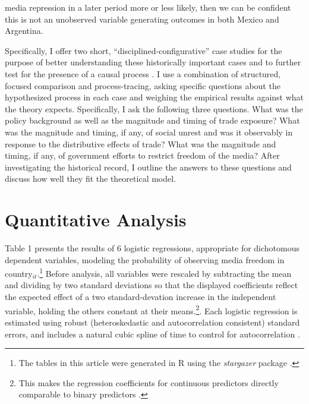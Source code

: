 \documentclass[12pt,a4paper]{article}
\begin{document}
media repression in a later period more or less likely, then we can be confident this is not an unobserved variable generating outcomes in both Mexico and Argentina.

Specifically, I offer two short, ``disciplined-configurative'' case studies for the purpose of better understanding these historically important cases and to further test for the presence of a causal process \parencite[75]{george2005case}. I use a combination of structured, focused comparison and process-tracing, asking specific questions about the hypothesized process in each case and weighing the empirical results against what the theory expects. Specifically, I ask the following three questions. What was the policy background as well as the magnitude and timing of trade exposure? What was the magnitude and timing, if any, of social unrest and was it observably in response to the distributive effects of trade? What was the magnitude and timing, if any, of government efforts to restrict freedom of the media? After investigating the historical record, I outline the answers to these questions and discuss how well they fit the theoretical model.

\section{Quantitative Analysis}

Table 1 presents the results of 6 logistic regressions, appropriate for dichotomous dependent variables, modeling the probability of observing media freedom in country$_{it}$.\footnote{The tables in this article were generated in R using the \emph{stargazer} package \parencite{stargazerLaTeXcod:vw}.} Before analysis, all variables were rescaled by subtracting the mean and dividing by two standard deviations so that the displayed coefficients reflect the expected effect of a two standard-devation increase in the independent variable, holding the others constant at their means.\footnote{This makes the regression coefficients for continuous predictors directly comparable to binary predictors \parencite{Gelman:2008gz}.}. Each logistic regression is estimated using robust (heteroskedastic and autocorrelation consistent) standard errors, and includes a natural cubic spline of time to control for autocorrelation \parencite{Beck:1998wg}.
\end{document}
